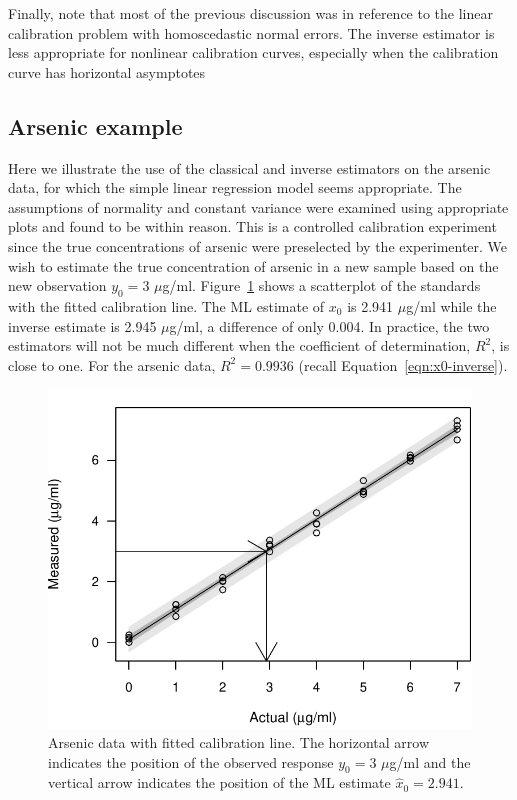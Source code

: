 \documentclass[cmfont,usenames,dvipsnames,leqno]{afit-etd}\usepackage[]{graphicx}\usepackage[]{color}
\makeatletter
\def\maxwidth{ %
  \ifdim\Gin@nat@width>\linewidth
    \linewidth
  \else
    \Gin@nat@width
  \fi
}
\newenvironment{knitrout}{}{} %
\renewenvironment{knitrout}{\begin{singlespace}}{\end{singlespace}}
\newcommand{\wh}[1]{\ensuremath{\widehat{#1}}}
\makeatother
\begin{document}
Finally, note that most of the previous discussion was in reference to the linear calibration problem with homoscedastic normal errors. The inverse estimator is less appropriate for nonlinear calibration curves, especially when the calibration curve has horizontal asymptotes \citep{jones_bootstrapping_1999}

\subsection{Arsenic example}
\label{sec:example_arsenic}
Here we illustrate the use of the classical and inverse estimators on the arsenic data, for which the simple linear regression model seems appropriate. The assumptions of normality and constant variance were examined using appropriate plots and found to be within reason. This is a controlled calibration experiment since the true concentrations of arsenic were preselected by the experimenter. We wish to estimate the true concentration of arsenic in a new sample based on the new observation $y_0 = 3$ $\mu$g/ml. Figure~\ref{fig:arsenic-fit} shows a scatterplot of the standards with the fitted calibration line. The \ac{ML} estimate of $x_0$ is 2.941 $\mu$g/ml while the inverse estimate is 2.945 $\mu$g/ml, a difference of only 0.004. In practice, the two estimators will not be much different when the coefficient of determination, $R^2$, is close to one. For the arsenic data, $R^2 = 0.9936$ (recall Equation~\ref{eqn:x0-inverse}).

\begin{knitrout}
\color{fgcolor}\begin{figure}[H]

\includegraphics[width=\maxwidth]{figure/arsenic-fit} \caption[Fitted calibration line for the arsenic data]{Arsenic data with fitted calibration line. The horizontal arrow indicates the position of the observed response $y_0 = 3$ $\mu$g/ml and the vertical arrow indicates the position of the \ac{ML} estimate $\wh{x}_0 = 2.941$.\label{fig:arsenic-fit}}
\end{figure}


\end{knitrout}
\end{document}
